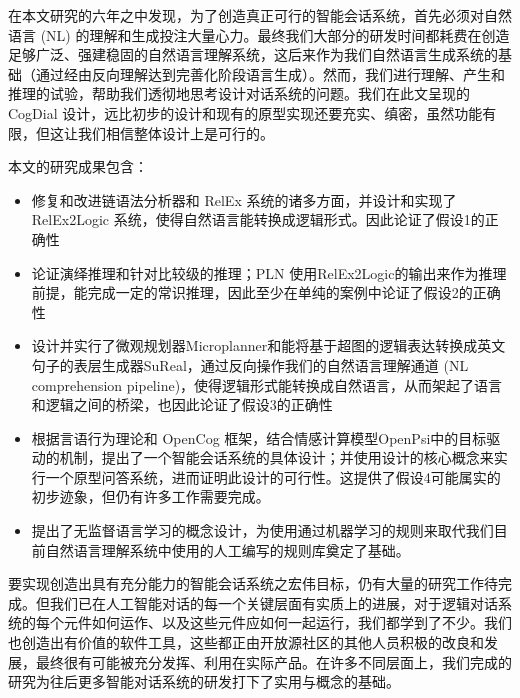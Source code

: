 在本文研究的六年之中发现，为了创造真正可行的智能会话系统，首先必须对自然语言 (NL) 的理解和生成投注大量心力。最终我们大部分的研发时间都耗费在创造足够广泛、强建稳固的自然语言理解系统，这后来作为我们自然语言生成系统的基础（通过经由反向理解达到完善化阶段语言生成）。然而，我们进行理解、产生和推理的试验，帮助我们透彻地思考设计对话系统的问题。我们在此文呈现的 CogDial 设计，远比初步的设计和现有的原型实现还要充实、缜密，虽然功能有限，但这让我们相信整体设计上是可行的。

本文的研究成果包含：

\begin{itemize}
\item 修复和改进链语法分析器和 RelEx 系统的诸多方面，并设计和实现了 RelEx2Logic 系统，使得自然语言能转换成逻辑形式。因此论证了假设1的正确性
\item 论证演绎推理和针对比较级的推理；PLN 使用RelEx2Logic的输出来作为推理前提，能完成一定的常识推理，因此至少在单纯的案例中论证了假设2的正确性
\item 设计并实行了微观规划器Microplanner和能将基于超图的逻辑表达转换成英文句子的表层生成器SuReal，通过反向操作我们的自然语言理解通道 (NL comprehension pipeline)，使得逻辑形式能转换成自然语言，从而架起了语言和逻辑之间的桥梁，也因此论证了假设3的正确性
\item 根据言语行为理论和 OpenCog 框架，结合情感计算模型OpenPsi中的目标驱动的机制，提出了一个智能会话系统的具体设计；并使用设计的核心概念来实行一个原型问答系统，进而证明此设计的可行性。这提供了假设4可能属实的初步迹象，但仍有许多工作需要完成。 
\item 提出了无监督语言学习的概念设计，为使用通过机器学习的规则来取代我们目前自然语言理解系统中使用的人工编写的规则库奠定了基础。

\end{itemize}

要实现创造出具有充分能力的智能会话系统之宏伟目标，仍有大量的研究工作待完成。但我们已在人工智能对话的每一个关键层面有实质上的进展，对于逻辑对话系统的每个元件如何运作、以及这些元件应如何一起运行，我们都学到了不少。我们也创造出有价值的软件工具，这些都正由开放源社区的其他人员积极的改良和发展，最终很有可能被充分发挥、利用在实际产品。在许多不同层面上，我们完成的研究为往后更多智能对话系统的研发打下了实用与概念的基础。

